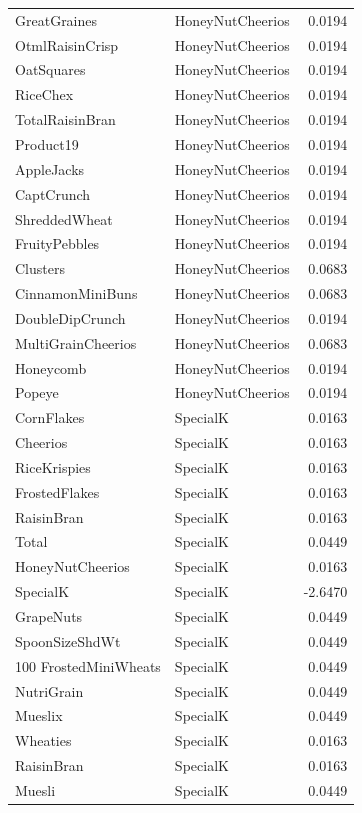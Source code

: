 \begin{longtable}{llr}
GreatGraines & HoneyNutCheerios & 0.0194 \\
OtmlRaisinCrisp & HoneyNutCheerios & 0.0194 \\
OatSquares & HoneyNutCheerios & 0.0194 \\
RiceChex & HoneyNutCheerios & 0.0194 \\
TotalRaisinBran & HoneyNutCheerios & 0.0194 \\
Product19 & HoneyNutCheerios & 0.0194 \\
AppleJacks & HoneyNutCheerios & 0.0194 \\
CaptCrunch & HoneyNutCheerios & 0.0194 \\
ShreddedWheat & HoneyNutCheerios & 0.0194 \\
FruityPebbles & HoneyNutCheerios & 0.0194 \\
Clusters & HoneyNutCheerios & 0.0683 \\
CinnamonMiniBuns & HoneyNutCheerios & 0.0683 \\
DoubleDipCrunch & HoneyNutCheerios & 0.0194 \\
MultiGrainCheerios & HoneyNutCheerios & 0.0683 \\
Honeycomb & HoneyNutCheerios & 0.0194 \\
Popeye & HoneyNutCheerios & 0.0194 \\
CornFlakes & SpecialK & 0.0163 \\
Cheerios & SpecialK & 0.0163 \\
RiceKrispies & SpecialK & 0.0163 \\
FrostedFlakes & SpecialK & 0.0163 \\
RaisinBran & SpecialK & 0.0163 \\
Total & SpecialK & 0.0449 \\
HoneyNutCheerios & SpecialK & 0.0163 \\
SpecialK & SpecialK & -2.6470 \\
GrapeNuts & SpecialK & 0.0449 \\
SpoonSizeShdWt & SpecialK & 0.0449 \\
100%
FrostedMiniWheats & SpecialK & 0.0449 \\
NutriGrain & SpecialK & 0.0449 \\
Mueslix & SpecialK & 0.0449 \\
Wheaties & SpecialK & 0.0163 \\
RaisinBran & SpecialK & 0.0163 \\
Muesli & SpecialK & 0.0449 \\

\end{longtable}
